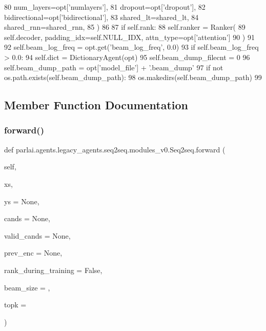 \begin{DoxyCode}
80             num\_layers=opt[\textcolor{stringliteral}{'numlayers'}],
81             dropout=opt[\textcolor{stringliteral}{'dropout'}],
82             bidirectional=opt[\textcolor{stringliteral}{'bidirectional'}],
83             shared\_lt=shared\_lt,
84             shared\_rnn=shared\_rnn,
85         )
86 
87         \textcolor{keywordflow}{if} self.rank:
88             self.ranker = Ranker(
89                 self.decoder, padding\_idx=self.NULL\_IDX, attn\_type=opt[\textcolor{stringliteral}{'attention'}]
90             )
91 
92         self.beam\_log\_freq = opt.get(\textcolor{stringliteral}{'beam\_log\_freq'}, 0.0)
93         \textcolor{keywordflow}{if} self.beam\_log\_freq > 0.0:
94             self.dict = DictionaryAgent(opt)
95             self.beam\_dump\_filecnt = 0
96             self.beam\_dump\_path = opt[\textcolor{stringliteral}{'model\_file'}] + \textcolor{stringliteral}{'.beam\_dump'}
97             \textcolor{keywordflow}{if} \textcolor{keywordflow}{not} os.path.exists(self.beam\_dump\_path):
98                 os.makedirs(self.beam\_dump\_path)
99 
\end{DoxyCode}


\subsection{Member Function Documentation}
\mbox{\label{classparlai_1_1agents_1_1legacy__agents_1_1seq2seq_1_1modules__v0_1_1Seq2seq_a5c8f9eaa59a088164f0e23de5ca37c67}} 
\subsubsection{\texorpdfstring{forward()}{forward()}}
{\footnotesize\ttfamily def parlai.\+agents.\+legacy\+\_\+agents.\+seq2seq.\+modules\+\_\+v0.\+Seq2seq.\+forward (\begin{DoxyParamCaption}\item[{}]{self,  }\item[{}]{xs,  }\item[{}]{ys = {\ttfamily None},  }\item[{}]{cands = {\ttfamily None},  }\item[{}]{valid\+\_\+cands = {\ttfamily None},  }\item[{}]{prev\+\_\+enc = {\ttfamily None},  }\item[{}]{rank\+\_\+during\+\_\+training = {\ttfamily False},  }\item[{}]{beam\+\_\+size = {},  }\item[{}]{topk = {} }\end{DoxyParamCaption})}


